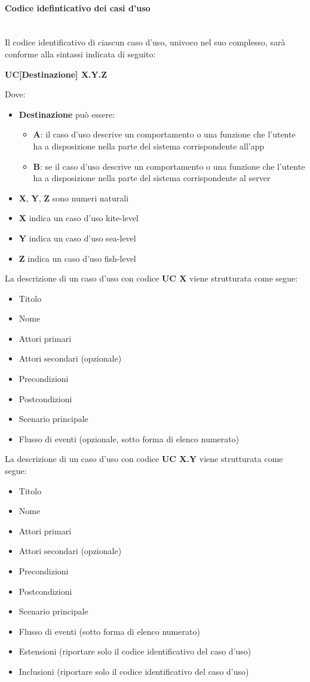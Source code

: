 \paragraph{Codice idefinticativo dei casi d'uso}\mbox{}\\
Il codice identificativo di ciascun caso d’uso, univoco nel suo complesso, sarà conforme alla sintassi indicata di seguito:
\begin{center}
	\textbf{UC[Destinazione] X.Y.Z}
\end{center}
Dove:
\begin{itemize}
	\item \textbf{Destinazione} può essere:
	\begin{itemize}
		\item \textbf{A}: il caso d’uso descrive un comportamento o una funzione che l’utente ha a disposizione nella parte del sistema corrispondente all’app
		\item \textbf{B}: se il caso d’uso descrive un comportamento o una funzione che l’utente ha a disposizione nella parte del sistema corrispondente al server
	\end{itemize}
	\item \textbf{X}, \textbf{Y}, \textbf{Z} sono numeri naturali
	\item \textbf{X} indica un caso d’uso kite-level
	\item \textbf{Y} indica un caso d’uso sea-level
	\item \textbf{Z} indica un caso d’uso fish-level
\end{itemize}
La descrizione di un caso d’uso con codice \textbf{UC X} viene strutturata come segue:
\begin{itemize}
	\item Titolo
	\item Nome
	\item Attori primari
	\item Attori secondari (opzionale)
	\item Precondizioni
	\item Postcondizioni
	\item Scenario principale
	\item Flusso di eventi (opzionale, sotto forma di elenco numerato)	
\end{itemize}
La descrizione di un caso d’uso con codice \textbf{UC X.Y} viene strutturata come segue:
\begin{itemize}
	\item Titolo
	\item Nome
	\item Attori primari
	\item Attori secondari (opzionale)
	\item Precondizioni
	\item Postcondizioni
	\item Scenario principale
	\item Flusso di eventi (sotto forma di elenco numerato)	
	\item Estensioni (riportare solo il codice identificativo del caso d’uso)
	\item Inclusioni (riportare solo il codice identificativo del caso d’uso)	
\end{itemize}

